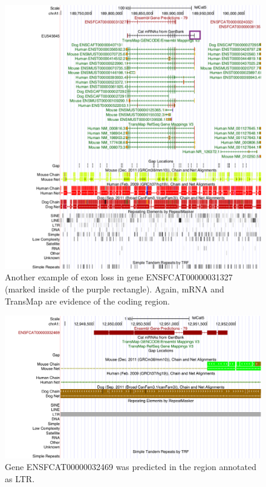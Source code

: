 \documentclass{article}
\begin{document}
\begin{figure}[h]
\centering
\includegraphics[width=\textwidth]{images/hgt_hgwdev_ed86_52bfa0_edit.pdf}
\caption{Another example of exon loss in gene ENSFCAT00000031327 (marked inside of the purple rectangle). Again, mRNA and TransMap are evidence of the coding region.}
\label{fig:missed_exons_mrna_2}
\end{figure}

\begin{figure}[h]
\centering
\includegraphics[width=\textwidth]{images/hgt_hgwdev_ede4_52c4e0.pdf}
\caption{Gene ENSFCAT00000032469 was predicted in the region annotated as LTR.}
\label{fig:gene_in_ltr}
\end{figure}
\end{document}
